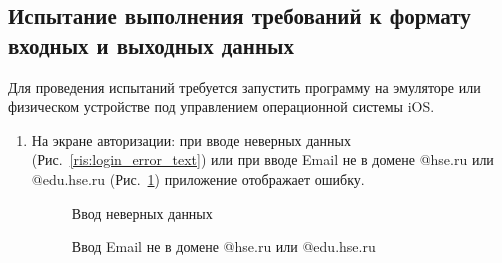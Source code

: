 \documentclass{../includes/TechDoc}
\begin{document}
    \clearpage

    \subsection{Испытание выполнения требований к формату входных и выходных данных}

    Для проведения испытаний требуется запустить программу на эмуляторе или физическом устройстве под управлением операционной системы iOS\@.

    \begin{enumerate}
        \item На экране авторизации: при вводе неверных данных (Рис.~\ref{ris:login_error_text}) или при вводе Email не в домене @hse.ru или @edu.hse.ru (Рис.~\ref{ris:login_error_email}) приложение отображает ошибку.
        \begin{figure}[h]
            \begin{center}
                \begin{minipage}[h]{0.49\linewidth}
                    \caption{Ввод неверных данных} %
                    \label{ris:login_error_text} %
                \end{minipage}
                \hfill
                \begin{minipage}[h]{0.49\linewidth}
                    \caption{Ввод Email не в домене @hse.ru или @edu.hse.ru}
                    \label{ris:login_error_email}
                \end{minipage}
            \end{center}
        \end{figure}


\end{enumerate}
\end{document}
